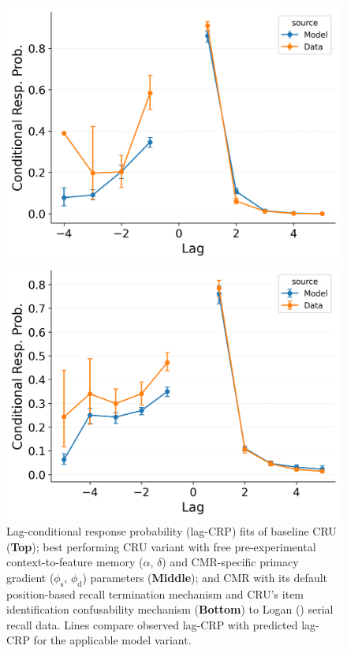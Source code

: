 \documentclass[
  man,
  floatsintext,
  longtable,
  nolmodern,
  notxfonts,
  notimes,
  draftfirst,
  colorlinks=true,linkcolor=blue,citecolor=blue,urlcolor=blue]{apa7}
\begin{document}
\begin{figure}

\caption{\label{fig-serial-crp}Lag-conditional response probability
(lag-CRP) fits of baseline CRU (\textbf{Top}); best performing CRU
variant with free pre-experimental context-to-feature memory
(\(\alpha\), \(\delta\)) and CMR-specific primacy gradient
(\(\phi_\text{s}\), \(\phi_\text{d}\)) parameters (\textbf{Middle}); and
CMR with its default position-based recall termination mechanism and
CRU's item identification confusability mechanism (\textbf{Bottom}) to
Logan () serial recall data. Lines
compare observed lag-CRP with predicted lag-CRP for the applicable model
variant.}

\begin{minipage}{0.33\linewidth}
\includegraphics{figures/Gordon2021_BaseCRU_with_ContextTerm_Confusable_Fitting_crp_LL5.png}\end{minipage}%
%
\begin{minipage}{0.33\linewidth}
\includegraphics{figures/Gordon2021_BaseCRU_with_ContextTerm_Confusable_Fitting_crp_LL6.png}\end{minipage}%

\end{figure}
\end{document}
